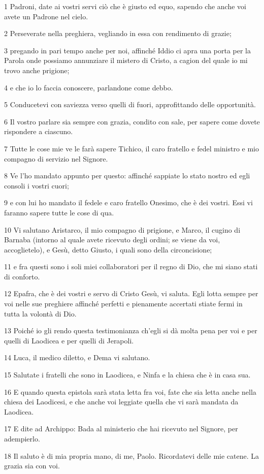 \par 1 Padroni, date ai vostri servi ciò che è giusto ed equo, sapendo che anche voi avete un Padrone nel cielo.
\par 2 Perseverate nella preghiera, vegliando in essa con rendimento di grazie;
\par 3 pregando in pari tempo anche per noi, affinché Iddio ci apra una porta per la Parola onde possiamo annunziare il mistero di Cristo, a cagion del quale io mi trovo anche prigione;
\par 4 e che io lo faccia conoscere, parlandone come debbo.
\par 5 Conducetevi con saviezza verso quelli di fuori, approfittando delle opportunità.
\par 6 Il vostro parlare sia sempre con grazia, condito con sale, per sapere come dovete rispondere a ciascuno.
\par 7 Tutte le cose mie ve le farà sapere Tichico, il caro fratello e fedel ministro e mio compagno di servizio nel Signore.
\par 8 Ve l'ho mandato appunto per questo: affinché sappiate lo stato nostro ed egli consoli i vostri cuori;
\par 9 e con lui ho mandato il fedele e caro fratello Onesimo, che è dei vostri. Essi vi faranno sapere tutte le cose di qua.
\par 10 Vi salutano Aristarco, il mio compagno di prigione, e Marco, il cugino di Barnaba (intorno al quale avete ricevuto degli ordini; se viene da voi, accoglietelo), e Gesù, detto Giusto, i quali sono della circoncisione;
\par 11 e fra questi sono i soli miei collaboratori per il regno di Dio, che mi siano stati di conforto.
\par 12 Epafra, che è dei vostri e servo di Cristo Gesù, vi saluta. Egli lotta sempre per voi nelle sue preghiere affinché perfetti e pienamente accertati stiate fermi in tutta la volontà di Dio.
\par 13 Poiché io gli rendo questa testimonianza ch'egli si dà molta pena per voi e per quelli di Laodicea e per quelli di Jerapoli.
\par 14 Luca, il medico diletto, e Dema vi salutano.
\par 15 Salutate i fratelli che sono in Laodicea, e Ninfa e la chiesa che è in casa sua.
\par 16 E quando questa epistola sarà stata letta fra voi, fate che sia letta anche nella chiesa dei Laodicesi, e che anche voi leggiate quella che vi sarà mandata da Laodicea.
\par 17 E dite ad Archippo: Bada al ministerio che hai ricevuto nel Signore, per adempierlo.
\par 18 Il saluto è di mia propria mano, di me, Paolo. Ricordatevi delle mie catene. La grazia sia con voi.



